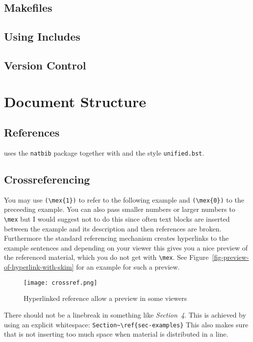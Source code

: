 \subsection{Makefiles}

\subsection{Using Includes}

\subsection{Version Control}


\section{Document Structure}




\subsection{References}

\lsp uses the \texttt{natbib} package together with \bibtex and the \bibtex style \texttt{unified.bst}.

\subsection{Crossreferencing}

You may use \verb+(\mex{1})+ to refer to the following example and \verb+(\mex{0})+ to the preceeding
example. You can also pass smaller numbers or larger numbers to \verb+\mex+ but I would suggest not
to do this since often text blocks are inserted between the example and its description and then
references are broken. Furthermore the standard referencing mechanism creates hyperlinks to the
example sentences and depending on your viewer this gives you a nice preview of the referenced
material, which you do not get with \verb+\mex+. See Figure~\vref{fig-preview-of-hyperlink-with-skim} for an example for such a preview.
\begin{figure}[htbp]
\texttt{[image: crossref.png]}
\caption{\label{fig-preview-of-hyperlink-with-skim}Hyperlinked reference allow a preview in some viewers}
\end{figure}


There should not be a linebreak in something like \emph{Section~4}. This is achieved by using an explicit
whitespace: \verb+Section~\ref{sec-examples}+ This also makes sure that \latex is not inserting too
much space when material is distributed in a line.


